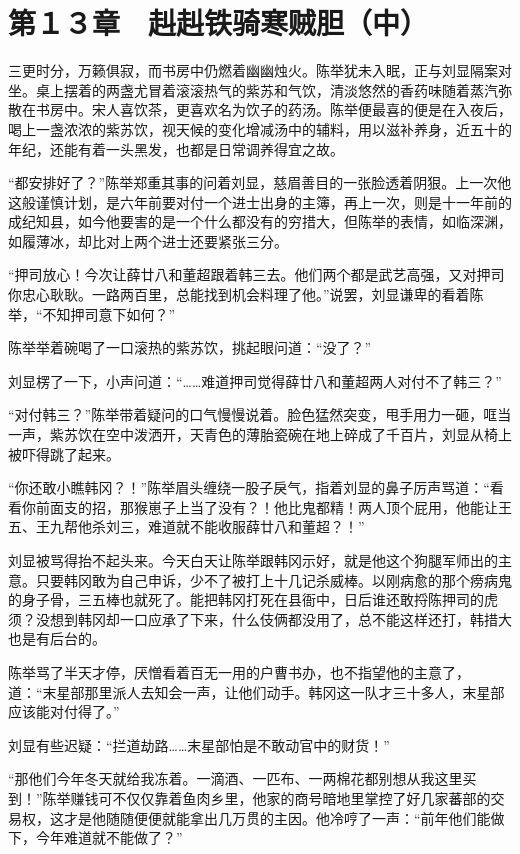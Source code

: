 \section{第１３章　赳赳铁骑寒贼胆（中）}

三更时分，万籁俱寂，而书房中仍燃着幽幽烛火。陈举犹未入眠，正与刘显隔案对坐。桌上摆着的两盏尤冒着滚滚热气的紫苏和气饮，清淡悠然的香药味随着蒸汽弥散在书房中。宋人喜饮茶，更喜欢名为饮子的药汤。陈举便最喜的便是在入夜后，喝上一盏浓浓的紫苏饮，视天候的变化增减汤中的辅料，用以滋补养身，近五十的年纪，还能有着一头黑发，也都是日常调养得宜之故。

“都安排好了？”陈举郑重其事的问着刘显，慈眉善目的一张脸透着阴狠。上一次他这般谨慎计划，是六年前要对付一个进士出身的主簿，再上一次，则是十一年前的成纪知县，如今他要害的是一个什么都没有的穷措大，但陈举的表情，如临深渊，如履薄冰，却比对上两个进士还要紧张三分。

“押司放心！今次让薛廿八和董超跟着韩三去。他们两个都是武艺高强，又对押司你忠心耿耿。一路两百里，总能找到机会料理了他。”说罢，刘显谦卑的看着陈举，“不知押司意下如何？”

陈举举着碗喝了一口滚热的紫苏饮，挑起眼问道：“没了？”

刘显楞了一下，小声问道：“……难道押司觉得薛廿八和董超两人对付不了韩三？”

“对付韩三？”陈举带着疑问的口气慢慢说着。脸色猛然突变，甩手用力一砸，哐当一声，紫苏饮在空中泼洒开，天青色的薄胎瓷碗在地上碎成了千百片，刘显从椅上被吓得跳了起来。

“你还敢小瞧韩冈？！”陈举眉头缠绕一股子戾气，指着刘显的鼻子厉声骂道：“看看你前面支的招，那猴崽子上当了没有？！他比鬼都精！两人顶个屁用，他能让王五、王九帮他杀刘三，难道就不能收服薛廿八和董超？！”

刘显被骂得抬不起头来。今天白天让陈举跟韩冈示好，就是他这个狗腿军师出的主意。只要韩冈敢为自己申诉，少不了被打上十几记杀威棒。以刚病愈的那个痨病鬼的身子骨，三五棒也就死了。能把韩冈打死在县衙中，日后谁还敢捋陈押司的虎须？没想到韩冈却一口应承了下来，什么伎俩都没用了，总不能这样还打，韩措大也是有后台的。

陈举骂了半天才停，厌憎看着百无一用的户曹书办，也不指望他的主意了，道：“末星部那里派人去知会一声，让他们动手。韩冈这一队才三十多人，末星部应该能对付得了。”

刘显有些迟疑：“拦道劫路……末星部怕是不敢动官中的财货！”

“那他们今年冬天就给我冻着。一滴酒、一匹布、一两棉花都别想从我这里买到！”陈举赚钱可不仅仅靠着鱼肉乡里，他家的商号暗地里掌控了好几家蕃部的交易权，这才是他随随便便就能拿出几万贯的主因。他冷哼了一声：“前年他们能做下，今年难道就不能做了？”


